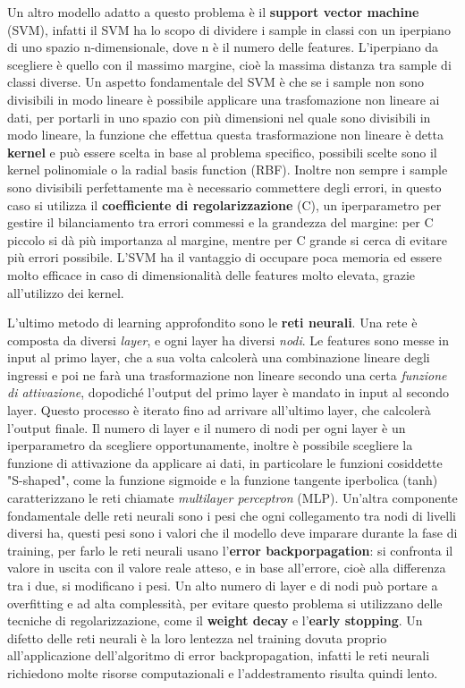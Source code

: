 Un altro modello adatto a questo problema è il \textbf{support vector machine} (SVM), infatti il SVM ha lo scopo di dividere i sample in classi con un iperpiano di uno spazio n-dimensionale, dove n è il numero delle features. L'iperpiano da scegliere è quello con il massimo margine, cioè la massima distanza tra sample di classi diverse. Un aspetto fondamentale del SVM è che se i sample non sono divisibili in modo lineare è possibile applicare una trasfomazione non lineare ai dati, per portarli in uno spazio con più dimensioni nel quale sono divisibili in modo lineare, la funzione che effettua questa trasformazione non lineare è detta \textbf{kernel} e può essere scelta in base al problema specifico, possibili scelte sono il kernel polinomiale o la radial basis function (RBF). Inoltre non sempre i sample sono divisibili perfettamente ma è necessario commettere degli errori, in questo caso si utilizza il \textbf{coefficiente di regolarizzazione} (C), un iperparametro per gestire il bilanciamento tra errori commessi e la grandezza del margine: per C piccolo si dà più importanza al margine, mentre per C grande si cerca di evitare più errori possibile. L'SVM ha il vantaggio di occupare poca memoria ed essere molto efficace in caso di dimensionalità delle features molto elevata, grazie all'utilizzo dei kernel.

L'ultimo metodo di learning approfondito sono le \textbf{reti neurali}. Una rete è composta da diversi \textit{layer}, e ogni layer ha diversi \textit{nodi}. Le features sono messe in input al primo layer, che a sua volta calcolerà una combinazione lineare degli ingressi e poi ne farà una trasformazione non lineare secondo una certa \textit{funzione di attivazione}, dopodiché l'output del primo layer è mandato in input al secondo layer. Questo processo è iterato fino ad arrivare all'ultimo layer, che calcolerà l'output finale. Il numero di layer e il numero di nodi per ogni layer è un iperparametro da scegliere opportunamente, inoltre è possibile scegliere la funzione di attivazione da applicare ai dati, in particolare le funzioni cosiddette "S-shaped", come la funzione sigmoide e la funzione tangente iperbolica (tanh) caratterizzano le reti chiamate \textit{multilayer perceptron} (MLP).  Un'altra componente fondamentale delle reti neurali sono i pesi che ogni collegamento tra nodi di livelli diversi ha, questi pesi sono i valori che il modello deve imparare durante la fase di training, per farlo le reti neurali usano l'\textbf{error backporpagation}: si confronta il valore in uscita con il valore reale atteso, e in base all'errore, cioè alla differenza tra i due, si modificano i pesi. Un alto numero di layer e di nodi può portare a overfitting e ad alta complessità, per evitare questo problema si utilizzano delle tecniche di regolarizzazione, come il \textbf{weight decay} e l'\textbf{early stopping}. Un difetto delle reti neurali è la loro lentezza nel training dovuta proprio all'applicazione dell'algoritmo di error backpropagation, infatti le reti neurali richiedono molte risorse computazionali e l'addestramento risulta quindi lento.

